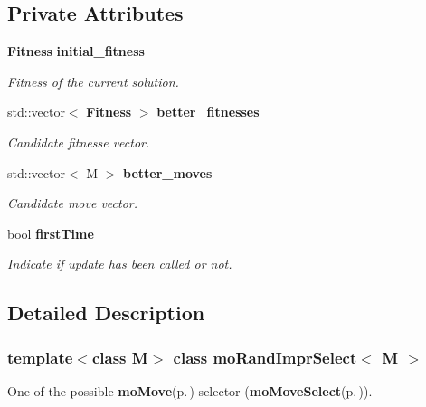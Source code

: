 \subsection*{Private Attributes}
\begin{CompactItemize}
\item 
{\bf Fitness} {\bf initial\_\-fitness}\label{classmo_rand_impr_select_r0}

\begin{CompactList}\small\item\em Fitness of the current solution. \item\end{CompactList}\item 
std::vector$<$ {\bf Fitness} $>$ {\bf better\_\-fitnesses}\label{classmo_rand_impr_select_r1}

\begin{CompactList}\small\item\em Candidate fitnesse vector. \item\end{CompactList}\item 
std::vector$<$ M $>$ {\bf better\_\-moves}\label{classmo_rand_impr_select_r2}

\begin{CompactList}\small\item\em Candidate move vector. \item\end{CompactList}\item 
bool {\bf first\-Time}\label{classmo_rand_impr_select_r3}

\begin{CompactList}\small\item\em Indicate if update has been called or not. \item\end{CompactList}\end{CompactItemize}


\subsection{Detailed Description}
\subsubsection*{template$<$class M$>$ class mo\-Rand\-Impr\-Select$<$ M $>$}

One of the possible {\bf mo\-Move}{\rm (p.\,\pageref{classmo_move})} selector ({\bf mo\-Move\-Select}{\rm (p.\,\pageref{classmo_move_select})}). 

